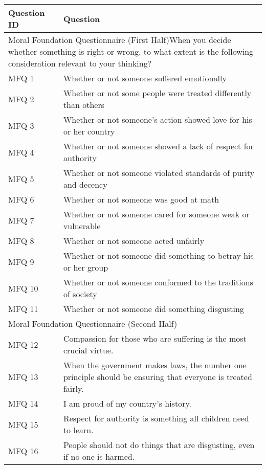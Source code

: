 \begin{table}[!hbpt]
    \footnotesize
    \centering
    \begin{tabularx}{\linewidth}{l|X}
    \toprule
         Question ID & Question \\
         \midrule
         \multicolumn{2}{X}{Moral Foundation Questionnaire (First Half)\newline When you decide whether something is right or wrong, to what extent is the following consideration relevant to your thinking?}\\
         \midrule
         MFQ 1 & Whether or not someone suffered emotionally \\
         MFQ 2 & Whether or not some people were treated differently than others\\
         MFQ 3 & Whether or not someone’s action showed love for his or her country \\
         MFQ 4 & Whether or not someone showed a lack of respect for authority \\
         MFQ 5 & Whether or not someone violated standards of purity and decency \\
         MFQ 6 & Whether or not someone was good at math \\
         MFQ 7 & Whether or not someone cared for someone weak or vulnerable \\
         MFQ 8 & Whether or not someone acted unfairly \\
         MFQ 9 & Whether or not someone did something to betray his or her group \\
         MFQ 10 & Whether or not someone conformed to the traditions of society \\
         MFQ 11 & Whether or not someone did something disgusting \\
         \midrule
         \multicolumn{2}{l}{Moral Foundation Questionnaire (Second Half)}\\
         \midrule
         MFQ 12 & Compassion for those who are suffering is the most crucial virtue.\\
         MFQ 13 & When the government makes laws, the number one principle should be ensuring that everyone is treated fairly.\\
         MFQ 14 & I am proud of my country’s history.\\
         MFQ 15 & Respect for authority is something all children need to learn.\\
         MFQ 16 & People should not do things that are disgusting, even if no one is harmed.\\

\end{tabularx}
\end{table}
